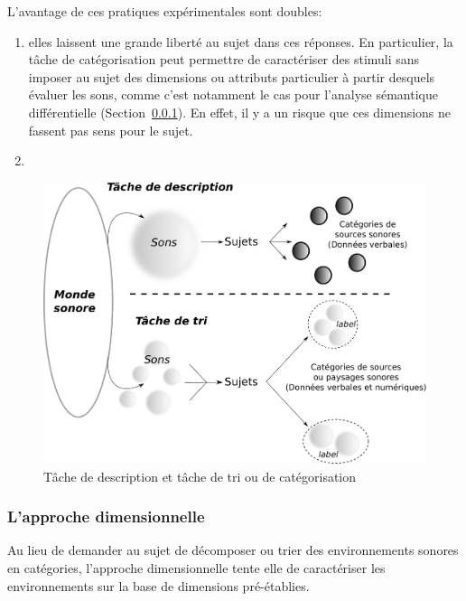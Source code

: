 L'avantage de ces pratiques expérimentales sont doubles:

\begin{enumerate}
\item  elles laissent une grande liberté au sujet dans ces réponses. En particulier, la tâche de catégorisation peut permettre de caractériser des stimuli sans imposer au sujet des dimensions ou attributs particulier à partir desquels évaluer les sons, comme c'est notamment le cas pour l'analyse sémantique différentielle (\Cf Section~\ref{}). En effet, il y a un risque que ces dimensions ne fassent pas sens pour le sujet. 
\item {}
\end{enumerate}

\begin{figure}[bth]
        \myfloatalign
        \includegraphics[width=\linewidth]{gfx/desCat}
        \caption{Tâche de description et tâche de tri ou de catégorisation}\label{fig:descat}
\end{figure}


\subsubsection{L'approche dimensionnelle}

Au lieu de demander au sujet de décomposer ou trier des environnements sonores en catégories, l'approche dimensionnelle tente elle de caractériser les environnements sur la base de dimensions pré-établies. 

